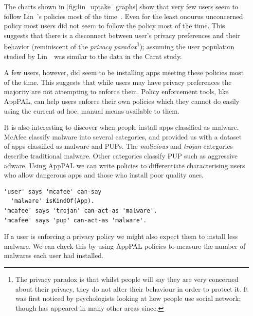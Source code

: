 \documentclass[thesis.tex]{subfiles}
\begin{document}
The charts shown in \autoref{fig:lin_uptake_graphs} show that very few users seem to follow Lin~\etal's policies most of the time~\cite{hallett_apppal_2016}.  Even for the least onourus unconcerned policy most users did not seem to follow the policy most of the time.
This suggests that there is a disconnect between user's privacy preferences and their behavior (reminiscent of the \emph{privacy paradox}\footnote{The privacy paradox is that whilst people will say they are very concerned about their privacy, they do not alter their behaviour in order to protect it.  It was first noticed by psychologists looking at how people use social network; though has appeared in many other areas since.}); assuming the user population studied by Lin~\etal~was similar to the data in the Carat study.

A few users, however, did seem to be installing apps meeting these policies most of the time.
This suggests that while users may have privacy preferences the majority are not attempting to enforce them.
Policy enforcement tools, like AppPAL, can help users enforce their own policies which they cannot do easily using the current ad hoc, manual means available to them.

It is also interesting to discover when people install apps classified as malware.
McAfee classify malware into several categories, and provided us with a dataset of apps classified as malware and \acp{PUP}.
The \emph{malicious} and \emph{trojan} categories describe traditional malware.
Other categories classify \ac{PUP} such as aggressive adware.
Using AppPAL we can write policies to differentiate characterising users who allow dangerous apps and those who install poor quality ones.
\begin{lstlisting}
'user' says 'mcafee' can-say
  'malware' isKindOf(App).
'mcafee' says 'trojan' can-act-as 'malware'.
'mcafee' says 'pup' can-act-as 'malware'.
\end{lstlisting}
If a user is enforcing a privacy policy we might also expect them to install less malware.
We can check this by using AppPAL policies to measure the number of malwares each user had installed.
\end{document}
